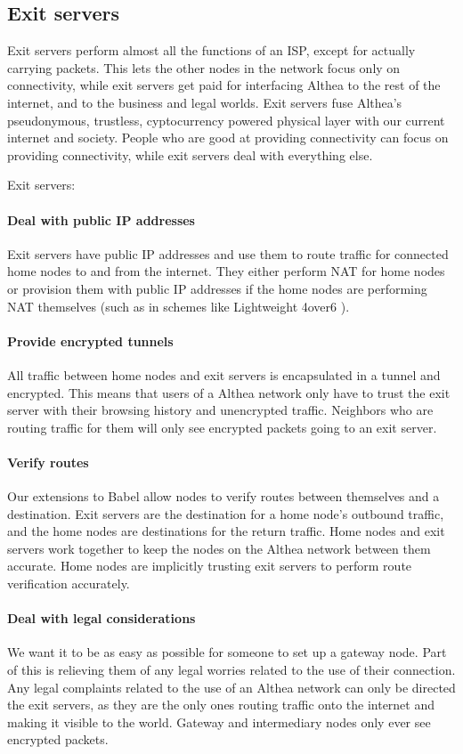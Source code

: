 \documentclass[11pt]{article}
\begin{document}
\subsection{Exit servers}
Exit servers perform almost all the functions of an ISP, except for actually carrying packets. This lets the other nodes in the network focus only on connectivity, while exit servers get paid for interfacing Althea to the rest of the internet, and to the business and legal worlds. Exit servers fuse Althea’s pseudonymous, trustless, cyptocurrency powered physical layer with our current internet and society. People who are good at providing connectivity can focus on providing connectivity, while exit servers deal with everything else. 

Exit servers:

\paragraph{Deal with public IP addresses}
Exit servers have public IP addresses and use them to route traffic for connected home nodes to and from the internet. They either perform NAT for home nodes or provision them with public IP addresses if the home nodes are performing NAT themselves (such as in schemes like Lightweight 4over6 \cite{4over6}). 

\paragraph{Provide encrypted tunnels}
All traffic between home nodes and exit servers is encapsulated in a tunnel and encrypted. This means that users of a Althea network only have to trust the exit server with their browsing history and unencrypted traffic. Neighbors who are routing traffic for them will only see encrypted packets going to an exit server.

\paragraph{Verify routes}
Our extensions to Babel allow nodes to verify routes between themselves and a destination. Exit servers are the destination for a home node’s outbound traffic, and the home nodes are destinations for the return traffic. Home nodes and exit servers work together to keep the nodes on the Althea network between them accurate. Home nodes are implicitly trusting exit servers to perform route verification accurately.

\paragraph{Deal with legal considerations}
We want it to be as easy as possible for someone to set up a gateway node. Part of this is relieving them of any legal worries related to the use of their connection. Any legal complaints related to the use of an Althea network can only be directed the exit servers, as they are the only ones routing traffic onto the internet and making it visible to the world. Gateway and intermediary nodes only ever see encrypted packets.
\end{document}
